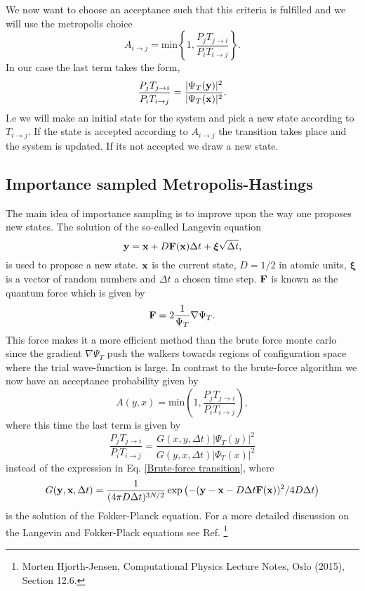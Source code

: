 \documentclass[a4paper,10pt]{article}
\begin{document}
We now want to choose an acceptance such that this criteria is fulfilled and we will use the metropolis choice
\begin{equation}
 A_{i\rightarrow j} = \text{min} \left\{ 1,\frac{P_jT_{j\rightarrow i}}{P_iT_{i\rightarrow j}}\right\}.
\end{equation}
In our case the last term takes the form,
\begin{equation}
 \frac{P_jT_{j\rightarrow i}}{P_iT_{i\rightarrow j}} = \frac{|\Psi_T({\bf y})|^2}{|\Psi_T({\bf x})|^2}. \label{Brute-force transition}
\end{equation}
I.e we will make an initial state for the system and pick a new state according to $T_{i\rightarrow j}$. If the state is accepted according to $A_{i\rightarrow j}$ the transition
takes place and the system is updated. If its not accepted we draw a new state.
\subsection{Importance sampled Metropolis-Hastings}
The main idea of importance sampling is to improve upon the way one proposes new states. The solution of the 
so-called Langevin equation
\begin{equation}
 {\bf y} = {\bf x} + D{\bf F}({\bf x})\Delta t + {\bm \xi}\sqrt{\Delta t},
\end{equation}
is used to propose a new state. ${\bf x}$ is the current state, $D = 1/2$ in atomic units, ${\bm \xi}$ is a vector of random numbers and $\Delta t$ a chosen time step. ${\bf F}$ is known
as the quantum force which is given by
\begin{equation}
 {\bf F} = 2\frac{1}{\Psi_T}\nabla \Psi_T.
\end{equation}
This force makes it a more efficient method than the brute force monte carlo since the gradient $\nabla \Psi_T$ push the walkers towards regions of 
configuration space where the trial wave-function is large. In contrast to the brute-force algorithm we now have an acceptance probability given by
\begin{equation}
 A(y,x) = \text{min}(1,\frac{P_jT_{j\rightarrow i}}{P_iT_{i\rightarrow j}}),
\end{equation}
where this time the last term is given by
\begin{equation}
 \frac{P_jT_{j\rightarrow i}}{P_iT_{i\rightarrow j}} = \frac{G(x,y,\Delta t) |\Psi_T(y)|^2}{G(y,x,\Delta t )|\Psi_T(x)|^2} \label{importance acceptance}
\end{equation}
instead of the expression in Eq. \ref{Brute-force transition}, where 
\begin{equation}
 G({\bf y},{\bf x},\Delta t) = \frac{1}{(4\pi D \Delta t)^{3N/2}}\exp \left(-({\bf y} - {\bf x} - D\Delta t {\bf F}({\bf x}))^2 / 4D\Delta t\right)
\end{equation}
is the solution of the Fokker-Planck equation. For a more detailed discussion on the Langevin and Fokker-Plack equations see Ref. \footnote{Morten Hjorth-Jensen, Computational Physics Lecture Notes, Oslo (2015), Section 12.6.}
\end{document}
